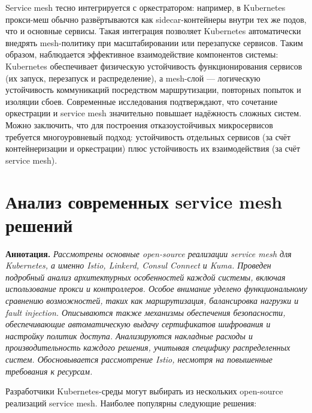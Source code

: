 Service mesh тесно интегрируется с оркестратором: например, в Kubernetes прокси-меш обычно развёртываются как sidecar-контейнеры внутри тех же подов, что и основные сервисы. Такая интеграция позволяет Kubernetes автоматически внедрять mesh-политику при масштабировании или перезапуске сервисов. Таким образом, наблюдается эффективное взаимодействие компонентов системы: Kubernetes обеспечивает физическую устойчивость функционирования сервисов (их запуск, перезапуск и распределение), а mesh-слой — логическую устойчивость коммуникаций посредством маршрутизации, повторных попыток и изоляции сбоев. Современные исследования подтверждают, что сочетание оркестрации и service mesh значительно повышает надёжность сложных систем\cite{palavesam2025}. Можно заключить, что для построения отказоустойчивых микросервисов требуется многоуровневый подход: устойчивость отдельных сервисов (за счёт контейнеризации и оркестрации) плюс устойчивость их взаимодействия (за счёт service mesh).

\section{Анализ современных service mesh решений}

\textbf{Аннотация. }\textit{Рассмотрены основные open-source реализации service mesh для Kubernetes, а именно Istio, Linkerd, Consul Connect и Kuma. Проведен подробный анализ архитектурных особенностей каждой системы, включая использование прокси и контроллеров. Особое внимание уделено функциональному сравнению возможностей, таких как маршрутизация, балансировка нагрузки и fault injection. Описываются также механизмы обеспечения безопасности, обеспечивающие автоматическую выдачу сертификатов шифрования и настройку политик доступа. Анализируются накладные расходы и производительность каждого решения, учитывая специфику распределенных систем. Обосновывается рассмотрение Istio, несмотря на повышенные требования к ресурсам.}


Разработчики Kubernetes-среды могут выбирать из нескольких open-source реализаций service mesh. Наиболее популярны следующие решения:

